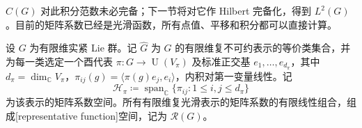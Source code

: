 \(C(G)\) 对此积分范数未必完备；下一节将对它作 Hilbert 完备化，得到 \(L^2(G)\)。目前的矩阵系数已经是光滑函数，所有点值、平移和积分都可以直接计算。

\begin{definition}\label{g1:def:representative-functions}
	设 \(G\) 为有限维实紧 Lie 群。记 \(\widehat G\) 为 \(G\) 的有限维复不可约表示的等价类集合，并为每一类选定一个酉代表 \(\pi:G\to\operatorname{U}(V_\pi)\) 及标准正交基 \(e_1,\ldots,e_{d_\pi}\)，其中 \(d_\pi=\dim_{\mathbb C}V_\pi\)，\(\pi_{ij}(g)=\langle\pi(g)e_j,e_i\rangle\)，内积对第一变量线性。记
	\[
		\mathcal H_\pi\coloneqq\operatorname{span}_{\mathbb C}\{\pi_{ij}:1\le i,j\le d_\pi\}
	\]
	为该表示的矩阵系数空间。所有有限维复光滑表示的矩阵系数的有限线性组合，组成[representative function]空间，记为 \(\mathcal R(G)\)。
\end{definition}

